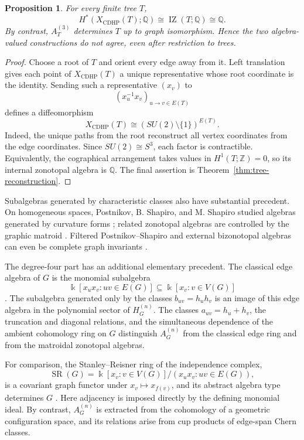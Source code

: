 \documentclass[11pt]{amsart}
\theoremstyle{plain}
\newtheorem{proposition}[theorem]{Proposition}
\theoremstyle{definition}
\theoremstyle{remark}
\newcommand{\Q}{\mathbb{Q}}
\begin{document}
\begin{proposition}\label{prop:crowley-tree-comparison}
For every finite tree $T$,
\[
  H^*(X_{\mathrm{CDHP}}(T);\Q)
  \cong \operatorname{IZ}(T;\Q)
  \cong \Q.
\]
By contrast, $A_T^{(3)}$ determines $T$ up to graph isomorphism.  Hence the two
algebra-valued constructions do not agree, even after restriction to trees.
\end{proposition}

\begin{proof}
Choose a root of $T$ and orient every edge away from it.  Left translation
gives each point of $X_{\mathrm{CDHP}}(T)$ a unique representative whose root
coordinate is the identity.  Sending such a representative $(x_v)$ to
\[
  (x_u^{-1}x_v)_{u\to v\in E(T)}
\]
defines a diffeomorphism
\[
  X_{\mathrm{CDHP}}(T)
  \cong (SU(2)\setminus\{1\})^{E(T)}.
\]
Indeed, the unique paths from the root reconstruct all vertex coordinates
from the edge coordinates.  Since $SU(2)\cong S^3$, each factor is
contractible.  Equivalently, the cographical arrangement takes values in
$H^1(T;\mathbb{Z})=0$, so its internal zonotopal algebra is $\Q$.  The final
assertion is Theorem~\ref{thm:tree-reconstruction}.
\end{proof}

Subalgebras generated by characteristic classes also have substantial
precedent.  On homogeneous spaces, Postnikov, B. Shapiro, and M. Shapiro
studied algebras generated by curvature forms \cite{PostnikovShapiroShapiro};
related zonotopal algebras are controlled by the graphic matroid
\cite{NenashevZonotopal}.
Filtered Postnikov--Shapiro and external bizonotopal algebras can even be
complete graph invariants
\cite{NenashevShapiro,KirillovNenashevShapiroVaintrob}.

The degree-four part has an additional elementary precedent.  The classical
edge algebra of $G$ is the monomial subalgebra
\[
  \Bbbk[x_ux_v:uv\in E(G)]\subseteq\Bbbk[x_v:v\in V(G)]
\]
\cite{Katzman}.  The subalgebra generated only by the classes $b_{uv}=h_uh_v$
is an image of this edge algebra in the polynomial sector of
$H_G^{(n)}$.  The classes $a_{uv}=h_u+h_v$, the truncation and diagonal
relations, and the simultaneous dependence of the ambient cohomology ring on
$G$ distinguish $A_G^{(n)}$ from the classical edge ring and from the
matroidal zonotopal algebras.

For comparison, the Stanley--Reisner ring of the independence complex,
\[
  \operatorname{SR}(G)
  =
  \Bbbk[x_v:v\in V(G)]/(x_ux_v:uv\in E(G)),
\]
is a covariant graph functor under $x_v\mapsto x_{f(v)}$, and its abstract
algebra type determines $G$ \cite{BrunsGubeladze}.  Here adjacency is imposed
directly by the defining monomial ideal.  By contrast, $A_G^{(n)}$ is
extracted from the cohomology of a geometric configuration space, and its
relations arise from cup products of edge-span Chern classes.
\end{document}
